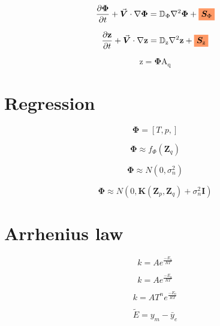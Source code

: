 \documentclass[20pt,twocolumn]{article}
\newcommand{\highlight}[1]{%
  \colorbox{pink-orange}{$\displaystyle#1$}}
\begin{document}
\begin{equation*}
\frac{\partial \bm{\Phi}}{\partial t} + \vec{\bm{V}} \cdot \nabla \bm{\Phi} = \mathbb{D}_{\Phi} \nabla^2 \bm{\Phi} + \highlight{\bm{S}_{\Phi}}
\end{equation*}

\begin{equation*}
\frac{\partial \bm{\mathrm{z}}}{\partial t} + \vec{\bm{V}} \cdot \nabla \bm{\mathrm{z}} = \mathbb{D}_{\mathrm{z}} \nabla^2 \bm{\mathrm{z}} + \highlight{\bm{S}_{\mathrm{z}}}
\end{equation*}


\begin{equation*}
\bm{\mathrm{z}} = \bm{\Phi} \bm{\mathrm{A_q}}
\end{equation*}








\section{Regression}

\begin{equation*}
\bm{\Phi} = [T, p, ]
\end{equation*}

\begin{equation*}
\bm{\Phi} \approx f_{\Phi} (\bm{Z}_q)
\end{equation*}

\begin{equation*}
\bm{\Phi} \approx N (0, \sigma_{n}^2)
\end{equation*}

\begin{equation*}
\bm{\Phi} \approx N (0, \bm{K}(\bm{Z}_p, \bm{Z}_q) + \sigma_{n}^2 \bm{I})
\end{equation*}

\section{Arrhenius law}

\begin{equation*}
k = A e^{\frac{-E_a}{R T}}
\end{equation*}

\begin{equation*}
k = A e^{\frac{-E_a}{R T}}
\end{equation*}

\begin{equation*}
k = A T^n e^{\frac{-E_a}{R T}}
\end{equation*}



\begin{equation*}
\tilde{E} = y_m - \bar{y}_e
\end{equation*}
\end{document}
